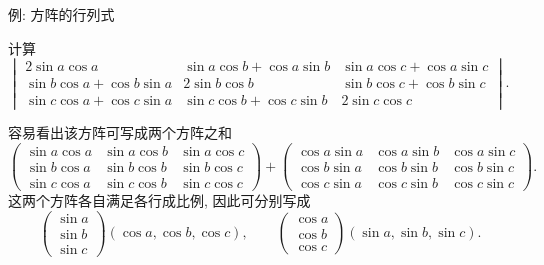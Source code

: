 \begin{frame}{例: 方阵的行列式}
	\onslide<+->
	\begin{example}
		计算
		$\begin{vmatrix}
			2\sin a\cos a&\sin a\cos b+\cos a\sin b&\sin a\cos c+\cos a\sin c\\
			\sin b\cos a+\cos b\sin a&2\sin b\cos b&\sin b\cos c+\cos b\sin c\\
			\sin c\cos a+\cos c\sin a&\sin c\cos b+\cos c\sin b&2\sin c\cos c
		\end{vmatrix}$.
	\end{example}
	\onslide<+->
	容易看出该方阵可写成两个方阵之和
	\[\begin{pmatrix}
		\sin a\cos a&\sin a\cos b&\sin a\cos c\\
		\sin b\cos a&\sin b\cos b&\sin b\cos c\\
		\sin c\cos a&\sin c\cos b&\sin c\cos c
	\end{pmatrix}+\begin{pmatrix}
		\cos a\sin a&\cos a\sin b&\cos a\sin c\\
		\cos b\sin a&\cos b\sin b&\cos b\sin c\\
		\cos c\sin a&\cos c\sin b&\cos c\sin c
	\end{pmatrix}.\]
	\onslide<+->
	这两个方阵各自满足各行成比例, 因此可分别写成
	\[\begin{pmatrix}
			\sin a\\
			\sin b\\
			\sin c
		\end{pmatrix}(\cos a,\cos b,\cos c),\qquad
		\begin{pmatrix}
			\cos a\\
			\cos b\\
			\cos c
		\end{pmatrix}(\sin a,\sin b,\sin c).\]
\end{frame}


